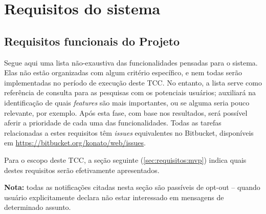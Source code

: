 \documentclass[12pt,a4paper,twoside,hyphens,english,brazil]{abntex2}
\begin{document}
\section{Requisitos do sistema} \label{sec:requisitos}

\subsection{Requisitos funcionais do Projeto}

Segue aqui uma lista não-exaustiva das funcionalidades pensadas para o sistema. Elas não estão organizadas com algum critério específico, e nem todas serão implementadas no período de execução deste TCC. No entanto, a lista serve como referência de consulta para as pesquisas com os potenciais usuários; auxiliará na identificação de quais \emph{features} são mais importantes, ou se alguma seria pouco relevante, por exemplo. Após esta fase, com base nos resultados, será possível aferir a prioridade de cada uma das funcionalidades. Todas as tarefas relacionadas a estes requisitos têm \emph{issues} equivalentes no Bitbucket, disponíveis em \url{https://bitbucket.org/konato/web/issues}.

Para o escopo deste TCC, a seção seguinte (\ref{sec:requisitos:mvp}) indica quais destes requisitos serão efetivamente apresentados.

\begin{framed}
	\textbf{Nota:} todas as notificações citadas nesta seção são passíveis de opt-out -- quando usuário explicitamente declara não estar interessado em mensagens de determinado assunto.
\end{framed}
\end{document}
